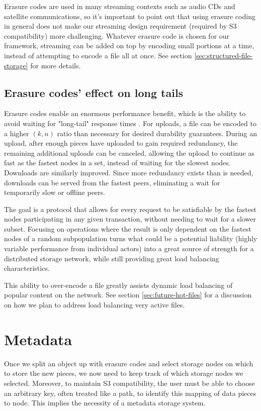 \documentclass[11pt,fleqn,openany]{book}
\begin{document}
Erasure codes are used in many streaming contexts such as audio CDs and
satellite communications, so it's important to point out that using erasure
coding in general does not make our streaming design requirement
(required by S3 compatibility) more challenging.
Whatever erasure code is chosen for our framework, streaming can be
added on top by encoding small portions at a time, instead of attempting to
encode a file all at once. See section \ref{sec:structured-file-storage} for
more details.

\subsection{Erasure codes' effect on long tails}

Erasure codes enable an enormous performance benefit, which is the ability to
avoid waiting for "long-tail" response times \cite{tail-at-scale}. For uploads,
a file can be encoded to a higher $(k, n)$ ratio than necessary for desired
durability guarantees.
During an upload, after enough pieces have uploaded to gain required
redundancy, the remaining additional uploads can be canceled, allowing the
upload to continue as fast as the fastest nodes in a set, instead of waiting
for the slowest nodes.
Downloads are similarly improved. Since more redundancy exists
than is needed, downloads can be served from the fastest peers, eliminating a
wait for temporarily slow or offline peers.

The goal is a protocol that allows for every request to be satisfiable by the
fastest nodes participating in any given transaction, without needing to wait
for a slower subset.
Focusing on operations where the result is only dependent on the fastest
nodes of a random subpopulation turns what could be a potential liability
(highly variable performance from individual actors) into a great source of
strength for a distributed storage network, while still providing great load
balancing characteristics.

This ability to over-encode a file greatly assists dynamic load balancing of
popular content on the network. See section \ref{sec:future-hot-files} for
a discussion on how we plan to address load balancing very active files.

\section{Metadata}

Once we split an object up with erasure codes and select storage nodes on
which to store the new pieces, we now need to keep track of which storage
nodes we selected.
Moreover, to maintain S3 compatibility, the user must be able to choose an
arbitrary key, often treated like a path, to identify this mapping of data
pieces to node. This implies the necessity of a metadata storage system.
\end{document}
